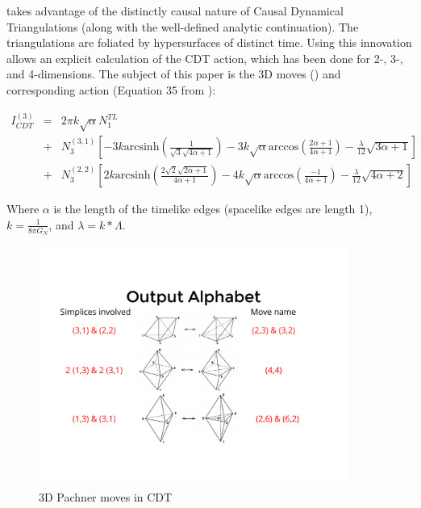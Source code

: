 \documentclass[12pt]{article}
\begin{document}
 takes advantage of the distinctly causal nature of Causal Dynamical Triangulations (along with the well-defined analytic continuation). The triangulations are foliated by
hypersurfaces of distinct time. Using this innovation allows an explicit calculation of the CDT action, which has been done for 2-, 3-, and 4-dimensions. The subject of this paper is
the 3D moves () and corresponding action (Equation 35 from \cite{j._ambjorn_dynamically_2001}):

\begin{equation}
  \begin{aligned}
    I_{CDT}^{(3)} &=& 2\pi k\sqrt{\alpha}N_1^{TL} \\
    &+& N_3^{(3,1)}\left[-3k\text{arcsinh}\left(\frac{1}{\sqrt{3}
    \sqrt{4\alpha +1}}\right)-3k\sqrt{\alpha}\text{arccos}\left(\frac{2\alpha+1}
    {4\alpha+1}\right)-\frac{\lambda}{12}\sqrt{3\alpha+1}\right] \\
    &+& N_3^{(2,2)}\left[2k\text{arcsinh}\left(\frac{2\sqrt{2}\sqrt{2\alpha+1}}
    {4\alpha +1}\right)-4k\sqrt{\alpha}\text{arccos}\left(\frac{-1}{4\alpha+1}
    \right)-\frac{\lambda}{12}\sqrt{4\alpha +2}\right]\label{cdt-eq}
  \end{aligned}
\end{equation}


Where $\alpha$ is the length of the timelike edges (spacelike edges are length 1), $k=\frac{1}{8\pi G_{N}}$, and $\lambda=k*\Lambda$.

\begin{figure}
  \begin{center}
  \includegraphics[width=4in]{3Dmoves.pdf}
  \caption{3D Pachner moves in CDT\label{3D-moves}}
  \end{center}
\end{figure}
\end{document}
